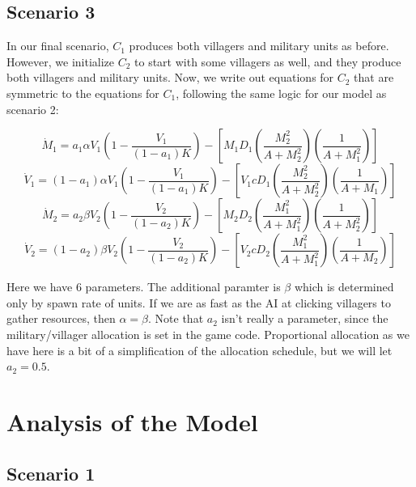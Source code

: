 \documentclass[12pt]{article}
\begin{document}
\subsection{Scenario 3}

 In our final scenario, $C_1$ produces both villagers and military units as before. However, we initialize $C_2$ to start with some villagers as well, and they produce both villagers and military units. Now, we write out equations for $C_2$ that are symmetric to the equations for $C_1$, following the same logic for our model as scenario 2: 

$$\dot M_1 =a_1 \alpha V_1(1-\frac{V_1}{(1 - a_1) K})-[M_1D_1(\frac{M_2^2}{A+M_2^2})(\frac{1}{A+M_1^2})]$$
$$\dot V_1=(1 - a_1) \alpha V_1(1-\frac{V_1}{(1 - a_1)K})-[V_1c D_1(\frac{M_2^2}{A+M_2^2})(\frac{1}{A +M_1})]$$
$$\dot M_2=a_2 \beta V_2(1-\frac{V_2}{(1 - a_2)K})-[M_2 D_2(\frac{M_1^2}{A+M_1^2})(\frac{1}{A +M_2^2})] $$
$$\dot V_2=(1 - a_2) \beta V_2(1-\frac{V_2}{(1-a_2)K})-[V_2 c D_2(\frac{M_1^2}{A+M_1^2})(\frac{1}{A +M_2})] $$

Here we have 6 parameters. The additional paramter is $\beta$ which is determined only by spawn rate of units. If we are as fast as the AI at clicking villagers to gather resources, then $\alpha = \beta$. Note that $a_2$ isn't really a parameter, since the military/villager allocation is set in the game code. Proportional allocation as we have here is a bit of a simplification of the allocation schedule, but we will let $a_2 = 0.5$.

\section{Analysis of the Model}

\subsection{Scenario 1}
\end{document}
